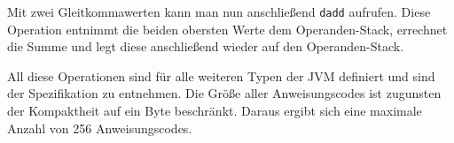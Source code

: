 Mit zwei Gleitkommawerten kann man nun anschließend \texttt{dadd} aufrufen. Diese Operation entnimmt die beiden obersten Werte dem Operanden-Stack, errechnet die Summe und legt diese anschließend wieder auf den Operanden-Stack.

All diese Operationen sind für alle weiteren Typen der JVM definiert und sind der Spezifikation zu entnehmen. Die Größe aller Anweisungscodes ist zugunsten der Kompaktheit auf ein Byte beschränkt. Daraus ergibt sich eine maximale Anzahl von 256 Anweisungscodes.